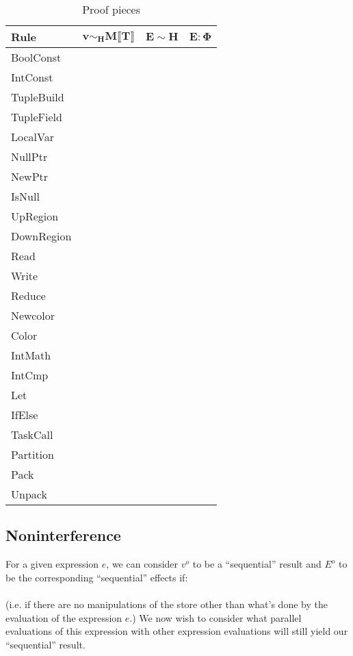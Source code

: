 \begin{table*}
\centering
{\small
\begin{tabular}{l|p{5cm}|p{5cm}|p{5cm}}
{\bf Rule} & 
\multicolumn{1}{|c|}{$\mathbf{v \sim_H M \llbracket T \rrbracket}$} &
\multicolumn{1}{|c|}{$\mathbf{E \sim H}$} &
\multicolumn{1}{|c|}{$\mathbf{E : \Phi}$} \\
\hline
BoolConst & & & \\
IntConst & & & \\
TupleBuild & & & \\
TupleField & & & \\
LocalVar & & & \\
NullPtr & & & \\
NewPtr & & & \\
IsNull & & & \\
UpRegion & & & \\
DownRegion & & & \\
Read & & & \\
Write & & & \\
Reduce & & & \\
Newcolor & & & \\
Color & & & \\
IntMath & & & \\
IntCmp & & & \\
Let & & & \\
IfElse & & & \\
TaskCall & & & \\
Partition & & & \\
Pack & & & \\
Unpack & & &
\end{tabular}}
\caption{Proof pieces}
\end{table*}


\subsection{Noninterference}

For a given expression $e$, we can consider $v^o$ to be a ``sequential'' result and $E^o$ to be the corresponding ``sequential'' effects if: \\

 \\

(i.e. if there are no manipulations of the store other than what's done by
the evaluation of the expression $e$.)  We now wish to consider what parallel
evaluations of this expression with other expression evaluations will still
yield our ``sequential'' result. \\


